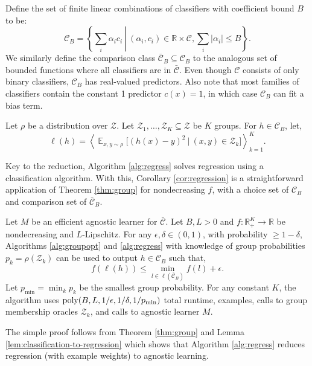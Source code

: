\documentclass[final, 12pt]{colt2018} %
\def\reals{{\mathbb R}}
\newcommand{\eps}{\epsilon}
\newcommand{\E}{\mathop{\mathbb{E}}}
\newcommand{\pmin}{p_{\text{min}}}
\def\calC{\mathcal{C}}
\def\calZ{\mathcal{Z}}
\newcommand{\poly}{\mathop{\mbox{\text{poly}}}}
\begin{document}
Define the set of finite linear combinations of classifiers with coefficient bound $B$ to be:
$$\calC_B=\left\{\left. \sum_i \alpha_i c_{i}~\right|~(\alpha_i, c_i)\in \reals\times \calC, \sum_i |\alpha_i|\leq B\right\}.$$
We similarly define the comparison class $\bar{\calC}_B\subseteq \calC_B$ to the analogous set of bounded functions where all classifiers are in $\bar{\calC}$. Even though $\calC$ consists of only binary classifiers, $\calC_B$ has real-valued predictors. Also note that most families of classifiers contain the constant 1 predictor $c(x)=1$, in which case $\calC_B$ can fit a bias term.

Let $\rho$ be a distribution over $\calZ$. Let $\calZ_1,\ldots,\calZ_K \subseteq \calZ$ be $K$ groups. For $h \in \calC_B$, let, 
$$\ell(h) = \left\langle\E_{x,y\sim\rho}\bigl[(h(x)-y)^2~\bigl|~(x,y) \in \calZ_k \bigr]\right\rangle_{k=1}^K.$$


Key to the reduction, Algorithm \ref{alg:regress} solves regression using a classification algorithm. With this, Corollary \ref{cor:regression} is a straightforward application of Theorem \ref{thm:group} for nondecreasing $f$, with a choice set of $\calC_B$ and comparison set of $\bar{\calC}_B$.

\begin{corollary}\label{cor:regression}
Let $M$ be an efficient agnostic learner for $\bar{\calC}$. Let $B, L>0$ and $f:\reals_+^K \rightarrow \reals$ be nondecreasing and $L$-Lipschitz. 
For any $\eps, \delta\in (0,1)$, with probability $\geq 1-\delta$, Algorithms \ref{alg:groupopt} and \ref{alg:regress} with knowledge of group probabilities $p_k=\rho(\calZ_k)$ can be used to output $h \in \calC_B$ such that,
$$f(\ell(h))\leq \min_{l\in \ell(\bar{\calC}_B)} f(l)+\eps.$$
Let $\pmin = \min_k p_k$ be the smallest group probability. For any constant $K$, the algorithm uses $\poly(B, L, 1/\eps, 1/\delta, 1/\pmin)$ total runtime, examples, calls to group membership oracles $\calZ_k$, and calls to agnostic learner $M$. 
\end{corollary}
The simple proof follows from Theorem \ref{thm:group} and Lemma \ref{lem:classification-to-regression} which shows that Algorithm \ref{alg:regress} reduces regression (with example weights) to agnostic learning.  
\end{document}
